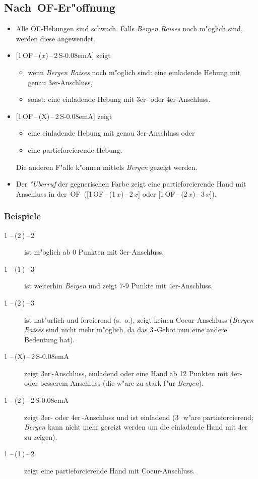 \documentclass[11pt,german,twocolumn]{scrartcl}
\renewcommand{\Cl}{{\color{ClColor}{$\clubsuit$}}}
\renewcommand{\Di}{{\color{DiColor}{$\vardiamondsuit$}}}
\renewcommand{\He}{{\color{HeColor}{$\varheartsuit$}}}
\renewcommand{\Sp}{{\color{SpColor}{$\spadesuit$}}}
\def\pik{\,\Sp}
\def\coe{\,\He}
\def\kar{\,\Di}
\def\tre{\,\Cl}
\def\of{\textsf{\,OF}}
\def\ofa{\textsf{OF}}
\def\SA{\textsf{\,S\kern-0.08emA}}
\def\kontra{\textsf{X}}
\def\sep{\,--\,}
\newcommand{\conv}[1]{\emph{#1}}
\begin{document}
\subsection{Nach \of-Er"offnung}
\begin{itemize}
\item Alle \ofa-Hebungen sind schwach.  Falls \conv{Bergen Raises}
  noch m"oglich sind, werden diese angewendet.
\item {[}1\of\sep($x$)\sep2\SA{]} zeigt
  \begin{itemize}
  \item wenn \conv{Bergen Raises} noch m"oglich sind: eine einladende
    Hebung mit genau 3er-Anschluss,
  \item sonst: eine einladende Hebung mit 3er- oder 4er-Anschluss.
  \end{itemize}
\item {[}1\of\sep(\kontra)\sep2\SA{]} zeigt
  \begin{itemize}
    \item eine einladende Hebung mit genau 3er-Anschluss oder
    \item eine partieforcierende Hebung.
  \end{itemize}
Die anderen F"alle k"onnen mittels \conv{Bergen} gezeigt werden.
\item Der \conv{"Uberruf} der gegnerischen Farbe zeigt eine
  partieforcierende Hand mit Anschluss in der \of\
  ([1\of\sep(1\,$x$)\sep2\,$x$] oder [1\of\sep(2\,$x$)\sep3\,$x$]).
\end{itemize}

\subsubsection{Beispiele}
\begin{description}
\item[1\pik\sep(2\kar)\sep2\pik] ist m"oglich ab 0 Punkten mit
  3er-Anschluss.
\item[1\coe\sep(1\pik)\sep3\kar] ist weiterhin \conv{Bergen} und zeigt
  7-9 Punkte mit 4er-Anschluss.
\item[1\coe\sep(2\tre)\sep3\kar] ist nat"urlich und forcierend
  (s.~o.), zeigt keinen Coeur-Anschluss (\conv{Bergen Raises} sind
  nicht mehr m"oglich, da das 3\tre-Gebot nun eine andere Bedeutung
  hat).
\item[1\pik\sep(X)\sep2\SA] zeigt 3er\pik-Anschluss, einladend oder
  eine Hand ab 12 Punkten mit 4er- oder besserem Anschluss (die w"are
  zu stark f"ur \conv{Bergen}).
\item[1\pik\sep(2\kar)\sep2\SA] zeigt 3er- oder 4er\pik-Anschluss und
  ist einladend (3\kar\ w"are partieforcierend; \conv{Bergen} kann
  nicht mehr gereizt werden um die einladende Hand mit 4er\pik{}
  zu zeigen).
\item[1\coe\sep(1\pik)\sep2\pik] zeigt eine partieforcierende Hand mit
  Coeur-Anschluss.
\end{description}
\end{document}
